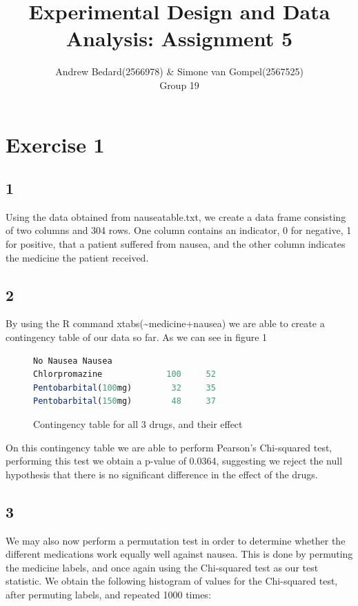 \documentclass{article}
\title{Experimental Design and Data Analysis: Assignment 5}
\author{Andrew Bedard(2566978) \& Simone van Gompel(2567525) \\ Group 19}
\begin{document}
  \maketitle

  \section*{Exercise 1}
    \subsection*{1}
    Using the data obtained from nauseatable.txt, we create a data frame consisting of two columns and 304 rows. One column contains an indicator, 0 for negative, 1 for positive, that a patient suffered from nausea, and the other column indicates the medicine the patient received.
    
    \subsection*{2}
    By using the R command xtabs(\textasciitilde medicine+nausea) we are able to create a contingency table of our data so far. As we can see in figure 1
    \begin{figure}[H]
    \begin{lstlisting}[language=R]
                     No Nausea Nausea
Chlorpromazine             100     52
Pentobarbital(100mg)        32     35
Pentobarbital(150mg)        48     37
    \end{lstlisting}
    \caption{Contingency table for all 3 drugs, and their effect}
    \label{fig:cont_table}
    \end{figure}
    
    On this contingency table we are able to perform Pearson's Chi-squared test, performing this test we obtain a p-value of 0.0364, suggesting we reject the null hypothesis that there is no significant difference in the effect of the drugs.
    
    \subsection*{3}
    We may also now perform a permutation test in order to determine whether the different medications work equally well against nausea. This is done by permuting the medicine labels, and once again using the Chi-squared test as our test statistic. We obtain the following histogram of values for the Chi-squared test, after permuting labels, and repeated 1000 times:
    
\end{document}
